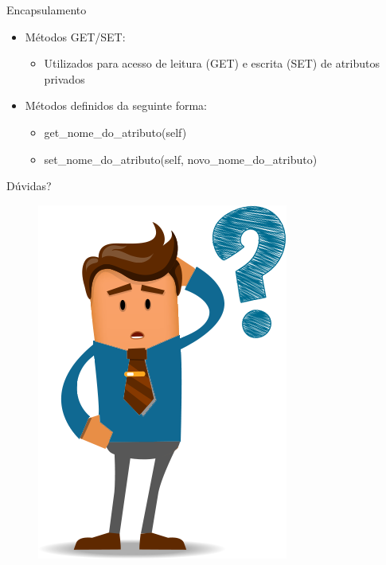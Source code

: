 \documentclass{beamer}
\begin{document}
\begin{frame}{Encapsulamento}
    \begin{itemize}
        \item Métodos GET/SET:
        \begin{itemize}
            \item Utilizados para acesso de leitura (GET) e escrita (SET) de atributos privados
        \end{itemize}
        \item Métodos definidos da seguinte forma:
        \begin{itemize}
            \item get\_nome\_do\_atributo(self)
            \item set\_nome\_do\_atributo(self, novo\_nome\_do\_atributo)
        \end{itemize}
    \end{itemize}
\end{frame}

\begin{frame}{Dúvidas?}
    \begin{figure}
        \includegraphics[scale=0.35]{Theme/Logos/duvidas_frequentes.png}
    \end{figure}
\end{frame}
\end{document}
